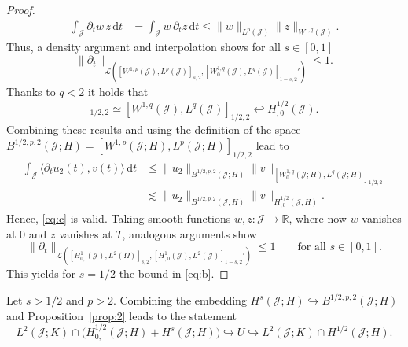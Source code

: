 \documentclass{amsart}
\providecommand{\dt}{\,\mathrm{d}t}
\newcommand{\R}{\mathbb R}
\newcommand{\cJ}{\mathcal J}
\newcommand{\cL}{\mathcal L}
\begin{document}
\begin{proof}
\begin{align*}
\int_{\cJ} \partial_t w\, z\dt &= \int_{\cJ} w\, \partial_t z\dt
\leq  \|w\|_{L^p(\cJ)} \|z\|_{W^{1,q}(\cJ)}.
\end{align*}
Thus, a density argument and interpolation shows for all $s \in [0,1]$
\begin{equation*}
\|\partial_t \|_{\cL(
[W^{1,p}(\cJ),L^p(\cJ)]_{s,2},
[W_0^{1,q}(\cJ),L^q(\cJ)]_{1-s,2}'
)} \leq 1.
\end{equation*}
Thanks to $q<2$ it holds that
\begin{equation*}
[W_0^{1,q}(\cJ),L^q(\cJ)]_{1/2,2} \simeq [W^{1,q}(\cJ),L^q(\cJ)]_{1/2,2} \hookleftarrow H_{,0}^{1/2}(\cJ).
\end{equation*}
Combining these results and using the definition of the space $B^{1/2,p,2}(\cJ;H) = [W^{1,p}(\cJ;H),L^p(\cJ;H)]_{1/2,2}$ lead to
\begin{equation*}
\begin{aligned}
\int_{\cJ} \langle \partial_t u_2(t),v(t)\rangle \dt 
& \leq \|u_2\|_{B^{1/2,p,2}(\cJ;H)}\|v\|_{[W_0^{1,q}(\cJ;H),L^q(\cJ;H)]_{1/2,2}} \\
& \lesssim \|u_2\|_{B^{1/2,p,2}(\cJ;H)}\|v\|_{H_{,0}^{1/2}(\cJ;H)}.
\end{aligned}
\end{equation*}
Hence, \eqref{eq:c} is valid.
%
Taking smooth functions $w,z\colon \cJ \rightarrow \R$, where now $w$ vanishes at $0$ and $z$ vanishes at $T$, analogous arguments show
\begin{equation*}
\|\partial_t \|_{\cL([H^1_{0,}(\cJ),L^2(\Omega)]_{s,2},[H^1_{,0}(\cJ),L^2(\cJ)]_{1-s,2}')} \leq 1\qquad\text{for all }s\in [0,1].
\end{equation*}
This yields for $s=1/2$ the bound in \eqref{eq:b}.
\end{proof}
%
\begin{remark} \label{rem:remmie}
Let $s > 1/2$ and $p>2$. Combining the embedding $H^s(\cJ;H)\hookrightarrow B^{1/2,p,2}(\cJ;H)$ and Proposition~\ref{prop:2} leads to the statement
\begin{equation*}
L^2(\cJ;K) \cap \big(H_{0,}^{1/2}(\cJ;H)+ H^{s}(\cJ;H)\big) \hookrightarrow U \hookrightarrow L^2(\cJ;K) \cap H^{1/2}(\cJ;H).
\end{equation*}
\end{remark}
\end{document}

